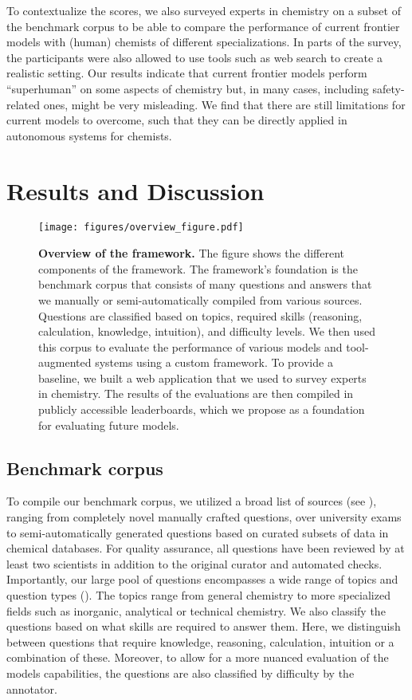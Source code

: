 \documentclass[11pt, oneside]{article}
\begin{document}
\begin{refsection}
To contextualize the scores, we also surveyed  experts in chemistry on a subset of the benchmark corpus to be able to compare the performance of current frontier models with (human) chemists of different specializations. In parts of the survey, the participants were also allowed to use tools such as web search to create a realistic setting.
Our results indicate that current frontier models perform \enquote{superhuman} on some aspects of chemistry but, in many cases, including safety-related ones, might be very misleading.
We find that there are still limitations for current models to overcome, such that they can be directly applied in autonomous systems for chemists.

\section{Results and Discussion}

\begin{figure}
    \texttt{[image: figures/overview\_figure.pdf]}
    \caption{\textbf{Overview of the \chembench framework.} The figure shows the different components of the \chembench framework.
    The framework's foundation is the benchmark corpus that consists of many questions and answers that we manually or semi-automatically compiled from various sources.
    Questions are classified based on topics, required skills (reasoning, calculation, knowledge, intuition), and difficulty levels.
    We then used this corpus to evaluate the performance of various models and tool-augmented systems using a custom framework. To provide a baseline, we built a web application that we used to survey experts in chemistry.
    The results of the evaluations are then compiled in publicly accessible leaderboards, which we propose as a foundation for evaluating future models.
    }
    \label{fig:overview_figure}
\end{figure}

\subsection{Benchmark corpus}

To compile our benchmark corpus, we utilized a broad list of sources (see ), ranging from completely novel manually crafted questions, over university exams to semi-automatically generated questions based on curated subsets of data in chemical databases.
For quality assurance, all questions have been reviewed by at least two scientists in addition to the original curator and automated checks.
Importantly, our large pool of questions encompasses a wide range of topics and question types (). The topics range from general chemistry to more specialized fields such as inorganic, analytical or technical chemistry.
We also classify the questions based on what skills are required to answer them. Here, we distinguish between questions that require knowledge, reasoning, calculation, intuition or a combination of these.
Moreover, to allow for a more nuanced evaluation of the models capabilities, the questions are also classified by difficulty by the annotator.


\end{refsection}
\end{document}

